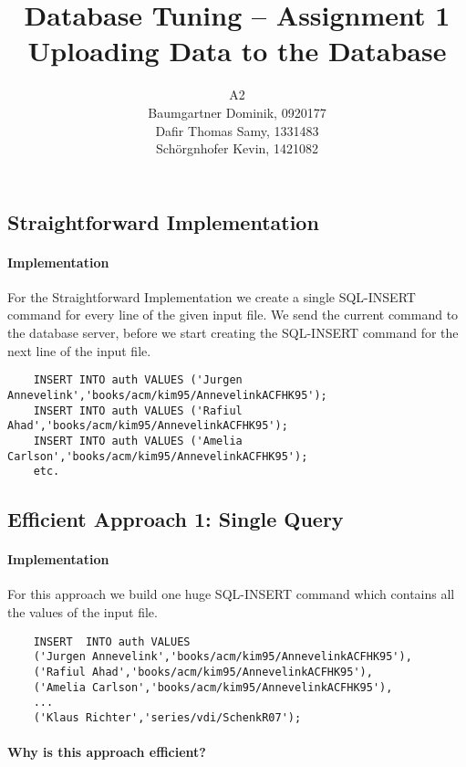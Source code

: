 \documentclass[11pt]{scrartcl}
\title{
  \textbf{\large Database Tuning -- Assignment 1}\\
  Uploading Data to the Database
}
\author{
 A2\\
\large Baumgartner Dominik, 0920177 \\
\large Dafir Thomas Samy, 1331483 \\
\large Sch\"orgnhofer Kevin, 1421082
}
\begin{document}
\maketitle

\subsection*{Straightforward Implementation}

  \paragraph{Implementation}

  For the Straightforward Implementation we create a single SQL-INSERT command for every line of the given input file. We send the current command to the database server, before we start creating the SQL-INSERT command for the next line of the input file.

{\small
\begin{verbatim}
    INSERT INTO auth VALUES ('Jurgen Annevelink','books/acm/kim95/AnnevelinkACFHK95');
    INSERT INTO auth VALUES ('Rafiul Ahad','books/acm/kim95/AnnevelinkACFHK95');
    INSERT INTO auth VALUES ('Amelia Carlson','books/acm/kim95/AnnevelinkACFHK95');
    etc.
\end{verbatim}
}

  \subsection*{Efficient Approach 1: Single Query}

  \paragraph{Implementation}

  For this approach we build one huge SQL-INSERT command which contains all the values of the input file.

{\small
\begin{verbatim}
    INSERT  INTO auth VALUES
    ('Jurgen Annevelink','books/acm/kim95/AnnevelinkACFHK95'),
    ('Rafiul Ahad','books/acm/kim95/AnnevelinkACFHK95'),
    ('Amelia Carlson','books/acm/kim95/AnnevelinkACFHK95'),
    ...
    ('Klaus Richter','series/vdi/SchenkR07');
\end{verbatim}
}

  \paragraph{Why is this approach efficient?}
\end{document}
